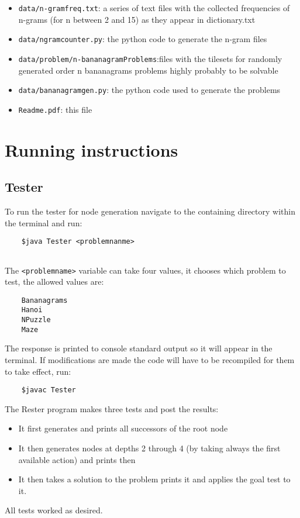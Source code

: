 \documentclass[10pt,letterpaper]{article}
\begin{document}
\begin{itemize}
	\item \lstinline!data/n-gramfreq.txt!: a series of text files with the collected frequencies of n-grams (for n between 2 and 15) as they appear in dictionary.txt
	\item \lstinline!data/ngramcounter.py!: the python code to generate the n-gram files
	\item\lstinline!data/problem/n-bananagramProblems!:files with the tilesets for randomly generated order n bananagrams problems highly probably to be solvable  
	\item \lstinline!data/bananagramgen.py!: the python code used to generate the problems
	
	\item \lstinline!Readme.pdf!: this file
	
	\end{itemize}
	
	\section{Running instructions}
	
	\subsection{Tester}
	To run the tester for node generation navigate to the containing directory within the terminal and run:
	
	\begin{lstlisting}
	$java Tester <problemnanme>
	
	\end{lstlisting}
	The \lstinline!<problemname>! variable can take four values, it chooses which problem to test, the allowed values are:
	\begin{lstlisting}
	Bananagrams
	Hanoi
	NPuzzle
	Maze
	\end{lstlisting}
	
	The response is printed to console standard output so it will appear in the terminal.
	If modifications are made the code will have to be recompiled for them to take effect, run:
	\begin{lstlisting}
	$javac Tester
	\end{lstlisting}
	The Rester program makes three tests and post the results:
	\begin{itemize}
	\item It first generates and prints all successors of the root node
	\item It then generates nodes at depths 2 through 4 (by taking always the first available action) and prints then
	\item It then takes a solution to the problem prints it and applies the goal test to it.
	\end{itemize}
	All tests worked as desired.
	
\end{document}
